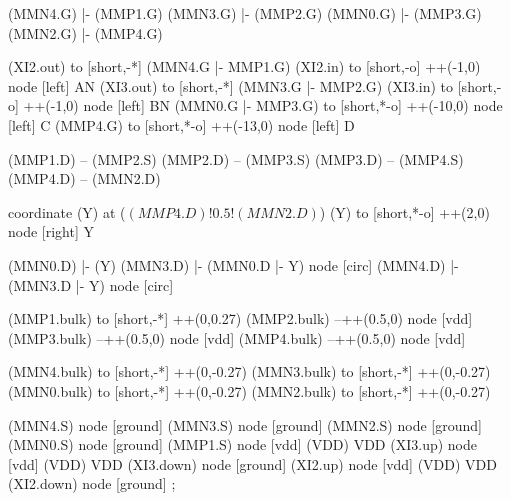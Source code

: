 \begin{circuitikz}[american]
	
	(MMN4.G) |- (MMP1.G)
	(MMN3.G) |- (MMP2.G)
	(MMN0.G) |- (MMP3.G)
	(MMN2.G) |- (MMP4.G)
	
	(XI2.out) to [short,-*] (MMN4.G |- MMP1.G)
	(XI2.in) to [short,-o] ++(-1,0) node [left] {AN}
	(XI3.out) to [short,-*] (MMN3.G |- MMP2.G)
	(XI3.in) to [short,-o] ++(-1,0) node [left] {BN}
	(MMN0.G |- MMP3.G) to [short,*-o] ++(-10,0) node [left] {C}
	(MMP4.G) to [short,*-o] ++(-13,0) node [left] {D}	
	
	(MMP1.D) -- (MMP2.S)
	(MMP2.D) -- (MMP3.S)	
	(MMP3.D) -- (MMP4.S)
	(MMP4.D) -- (MMN2.D)
	
	coordinate (Y) at ($(MMP4.D)!0.5!(MMN2.D)$)
	(Y) to [short,*-o] ++(2,0) node [right] {Y}
	
	(MMN0.D) |- (Y)
	(MMN3.D) |- (MMN0.D |- Y) node [circ] {}
	(MMN4.D) |- (MMN3.D |- Y) node [circ] {}
	
	(MMP1.bulk) to [short,-*] ++(0,0.27)
	(MMP2.bulk) --++(0.5,0) node [vdd] {}
	(MMP3.bulk) --++(0.5,0) node [vdd] {}
	(MMP4.bulk) --++(0.5,0) node [vdd] {}
	
	(MMN4.bulk) to [short,-*] ++(0,-0.27)
	(MMN3.bulk) to [short,-*] ++(0,-0.27)
	(MMN0.bulk) to [short,-*] ++(0,-0.27)
	(MMN2.bulk) to [short,-*] ++(0,-0.27)
	


	(MMN4.S) node [ground] {}
	(MMN3.S) node [ground] {}
	(MMN2.S) node [ground] {}
	(MMN0.S) node [ground] {}
	(MMP1.S) node [vdd] (VDD) {VDD}
	(XI3.up) node [vdd] (VDD) {VDD}
	(XI3.down) node [ground] {}
	(XI2.up) node [vdd] (VDD) {VDD}
	(XI2.down) node [ground] {}
;

\end{circuitikz}
